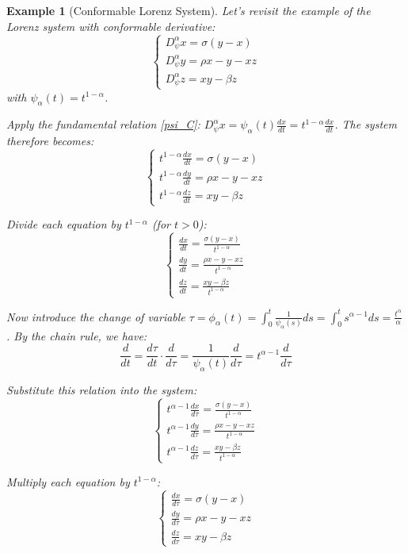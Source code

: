\documentclass[preprint,12pt]{elsarticle}
\newtheorem{example}{Example}
\begin{document}
\begin{example}[Conformable Lorenz System]
Let's revisit the example of the Lorenz system with conformable derivative:
\begin{equation}\label{lorenzconf}
\begin{cases}
D_\psi^\alpha x = \sigma(y - x) \\
D_\psi^\alpha y = \rho x - y - xz \\
D_\psi^\alpha z = xy - \beta z
\end{cases}
\end{equation}
with $\psi_\alpha(t) = t^{1-\alpha}$.

Apply the fundamental relation \eqref{psi_C}: $D_\psi^\alpha x = \psi_\alpha(t) \frac{dx}{dt} = t^{1-\alpha} \frac{dx}{dt}$.
The system therefore becomes:
\[
\begin{cases}
t^{1-\alpha} \frac{dx}{dt} = \sigma(y - x) \\
t^{1-\alpha} \frac{dy}{dt} = \rho x - y - xz \\
t^{1-\alpha} \frac{dz}{dt} = xy - \beta z
\end{cases}
\]

Divide each equation by $t^{1-\alpha}$ (for $t > 0$):
\[
\begin{cases}
\frac{dx}{dt} = \frac{\sigma(y - x)}{t^{1-\alpha}} \\
\frac{dy}{dt} = \frac{\rho x - y - xz}{t^{1-\alpha}} \\
\frac{dz}{dt} = \frac{xy - \beta z}{t^{1-\alpha}}
\end{cases}
\]

Now introduce the change of variable $\tau = \phi_\alpha(t) = \int_0^t \frac{1}{\psi_\alpha(s)} ds = \int_0^t s^{\alpha-1} ds = \frac{t^\alpha}{\alpha}$.
By the chain rule, we have:
\[
\frac{d}{dt} = \frac{d\tau}{dt} \cdot \frac{d}{d\tau} = \frac{1}{\psi_\alpha(t)} \frac{d}{d\tau} = t^{\alpha-1} \frac{d}{d\tau}
\]

Substitute this relation into the system:
\[
\begin{cases}
t^{\alpha-1} \frac{dx}{d\tau} = \frac{\sigma(y - x)}{t^{1-\alpha}} \\
t^{\alpha-1} \frac{dy}{d\tau} = \frac{\rho x - y - xz}{t^{1-\alpha}} \\
t^{\alpha-1} \frac{dz}{d\tau} = \frac{xy - \beta z}{t^{1-\alpha}}
\end{cases}
\]

Multiply each equation by $t^{1-\alpha}$:
\[
\begin{cases}
\frac{dx}{d\tau} = \sigma(y - x) \\
\frac{dy}{d\tau} = \rho x - y - xz \\
\frac{dz}{d\tau} = xy - \beta z
\end{cases}
\]


\end{example}
\end{document}
